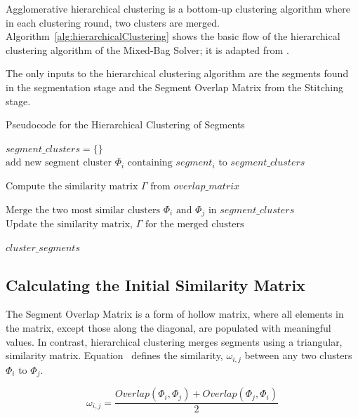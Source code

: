 Agglomerative hierarchical clustering is a bottom-up clustering algorithm where in each clustering round, two clusters are merged.  Algorithm~\ref{alg:hierarchicalClustering} shows the basic flow of the hierarchical clustering algorithm of the Mixed-Bag Solver; it is adapted from \cite{tanIntroToDataMining}.  

The only inputs to the hierarchical clustering algorithm are the segments found in the segmentation stage and the Segment Overlap Matrix from the Stitching stage.

\begin{algorithm}[tb]
\caption{Pseudocode for the Hierarchical Clustering of Segments}\label{alg:hierarchicalClustering}
\begin{algorithmic}[1]
	\State $\textit{segment\_clusters} = \{ \}$	
		\State $\text{add new segment cluster } \Phi_i \text{ containing } segment_i \text{ to } \textit{segment\_clusters}$
	\EndFor
\item[]
    \State $\text{Compute the similarity matrix } \Gamma \text{ from } overlap\_matrix$
\item[]
    	\State $\text{Merge the two most similar clusters } \Phi_i \text{ and } \Phi_j \text{ in } \textit{segment\_clusters}$
    	\State $\text{Update the similarity matrix, } \Gamma \text{ for the merged clusters}$
	\EndWhile
\item[]
    \State \Return $\textit{cluster\_segments}$
\EndFunction
\end{algorithmic}
\end{algorithm}

\subsection{Calculating the Initial Similarity Matrix}\label{sec:quantifyingSegmentSimilarity}

The Segment Overlap Matrix is a form of hollow matrix, where all elements in the matrix, except those along the diagonal, are populated with meaningful values.  In contrast, hierarchical clustering merges segments using a triangular, similarity matrix.  Equation~ defines the similarity, $\omega_{i,j}$ between any two clusters $\Phi_i$ to $\Phi_j$.

\begin{equation} \label{eq:segmentSimilarity}
\omega_{i,j} = \frac{Overlap(\Phi_i, \Phi_j) + Overlap(\Phi_j, \Phi_i)}{2} 
\end{equation}

